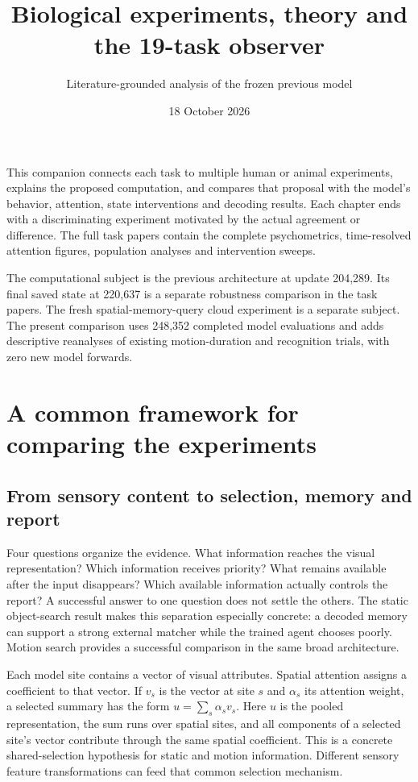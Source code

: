 \documentclass[11pt]{article}
\begin{document}
\title{Biological experiments, theory and the 19-task observer}
\author{Literature-grounded analysis of the frozen previous model}
\date{18 October 2026}\maketitle
This companion connects each task to multiple human or animal experiments, explains the proposed computation, and compares that proposal with the model's behavior, attention, state interventions and decoding results. Each chapter ends with a discriminating experiment motivated by the actual agreement or difference. The full task papers contain the complete psychometrics, time-resolved attention figures, population analyses and intervention sweeps.

The computational subject is the previous architecture at update 204,289. Its final saved state at 220,637 is a separate robustness comparison in the task papers. The fresh spatial-memory-query cloud experiment is a separate subject. The present comparison uses 248,352 completed model evaluations and adds descriptive reanalyses of existing motion-duration and recognition trials, with zero new model forwards.

\clearpage\setcounter{tocdepth}{1}\tableofcontents\clearpage
\section{A common framework for comparing the experiments}
\subsection{From sensory content to selection, memory and report}
Four questions organize the evidence. What information reaches the visual representation? Which information receives priority? What remains available after the input disappears? Which available information actually controls the report? A successful answer to one question does not settle the others. The static object-search result makes this separation especially concrete: a decoded memory can support a strong external matcher while the trained agent chooses poorly. Motion search provides a successful comparison in the same broad architecture.

Each model site contains a vector of visual attributes. Spatial attention assigns a coefficient to that vector. If $v_s$ is the vector at site $s$ and $\alpha_s$ its attention weight, a selected summary has the form $u=\sum_s\alpha_s v_s$. Here $u$ is the pooled representation, the sum runs over spatial sites, and all components of a selected site's vector contribute through the same spatial coefficient. This is a concrete shared-selection hypothesis for static and motion information. Different sensory feature transformations can feed that common selection mechanism.
\end{document}
